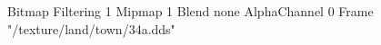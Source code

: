 {Bitmap
	{Filtering 1}
	{Mipmap 1}
	{Blend none}
	{AlphaChannel 0}
	{Frame "/texture/land/town/34a.dds"}
}

